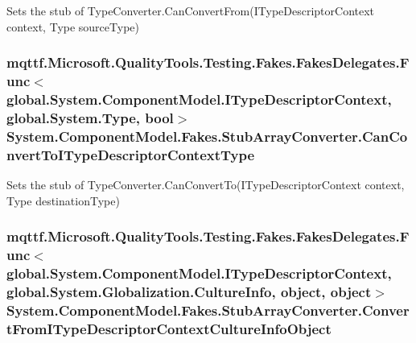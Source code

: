 Sets the stub of Type\-Converter.\-Can\-Convert\-From(\-I\-Type\-Descriptor\-Context context, Type source\-Type)

\hypertarget{class_system_1_1_component_model_1_1_fakes_1_1_stub_array_converter_aad8ae50902ab8aa8428e6d3d6c71ba2b}{
\subsubsection[{Can\-Convert\-To\-I\-Type\-Descriptor\-Context\-Type}]{\setlength{\rightskip}{0pt plus 5cm}mqttf.\-Microsoft.\-Quality\-Tools.\-Testing.\-Fakes.\-Fakes\-Delegates.\-Func$<$global.\-System.\-Component\-Model.\-I\-Type\-Descriptor\-Context, global.\-System.\-Type, bool$>$ System.\-Component\-Model.\-Fakes.\-Stub\-Array\-Converter.\-Can\-Convert\-To\-I\-Type\-Descriptor\-Context\-Type}}\label{class_system_1_1_component_model_1_1_fakes_1_1_stub_array_converter_aad8ae50902ab8aa8428e6d3d6c71ba2b}


Sets the stub of Type\-Converter.\-Can\-Convert\-To(\-I\-Type\-Descriptor\-Context context, Type destination\-Type)

\hypertarget{class_system_1_1_component_model_1_1_fakes_1_1_stub_array_converter_ade9f0850f820ac6084bf74672dd85868}{
\subsubsection[{Convert\-From\-I\-Type\-Descriptor\-Context\-Culture\-Info\-Object}]{\setlength{\rightskip}{0pt plus 5cm}mqttf.\-Microsoft.\-Quality\-Tools.\-Testing.\-Fakes.\-Fakes\-Delegates.\-Func$<$global.\-System.\-Component\-Model.\-I\-Type\-Descriptor\-Context, global.\-System.\-Globalization.\-Culture\-Info, object, object$>$ System.\-Component\-Model.\-Fakes.\-Stub\-Array\-Converter.\-Convert\-From\-I\-Type\-Descriptor\-Context\-Culture\-Info\-Object}}\label{class_system_1_1_component_model_1_1_fakes_1_1_stub_array_converter_ade9f0850f820ac6084bf74672dd85868}


